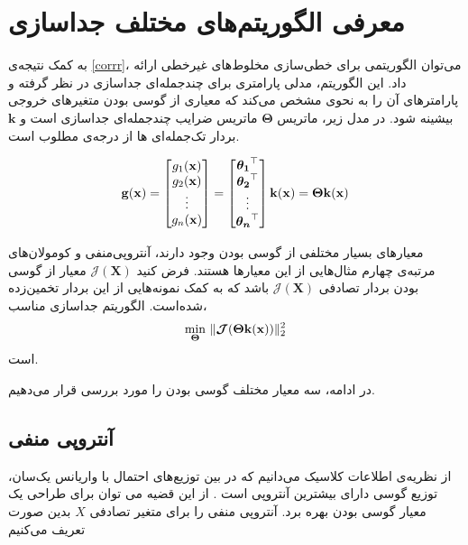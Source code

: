 \documentclass[oneside]{thesis}
\begin{document}
\section{معرفی الگوریتم‌های مختلف جداسازی}
به کمک نتیجه‌ی
\eqref{corrr}،
 می‌توان الگوریتمی برای خطی‌سازی مخلوط‌های غیرخطی ارائه داد. این الگوریتم، مدلی پارامتری برای چندجمله‌ای جداسازی در نظر گرفته و پارامترهای آن را به نحوی مشخص می‌کند که معیاری از گوسی بودن متغیر‌های خروجی بیشینه شود. در مدل زیر، ماتریس 
$\boldsymbol{\Theta}$
ماتریس ضرایب چند‌جمله‌ای جداسازی است و 
$\mathbf{k}$
بردار تک‌جمله‌ای ها از درجه‌ی مطلوب است.

\begin{equation*}
\label{E_Parametrizing}
{\mathbf{g}}({\mathbf{x}})=
\begin{bmatrix}
g_1({\mathbf{x}}) \\
g_2({\mathbf{x}}) \\
\vdots \\
g_n({\mathbf{x}})
\end{bmatrix}=
\begin{bmatrix}
\boldsymbol{\theta_1}^\top \\
\boldsymbol{\theta_2}^\top\\
\vdots \\
\boldsymbol{\theta_n}^\top
\end{bmatrix}{\mathbf{k}}({\mathbf{x}})=
\boldsymbol{\Theta}{\mathbf{k}}({\mathbf{x}})
\end{equation*}

معیارهای بسیار مختلفی از گوسی بودن وجود دارند، آنتروپی‌منفی و کومولان‌های مرتبه‌ی چهارم مثال‌هایی از این معیار‌ها هستند. فرض کنید 
$\mathcal{J}(\mathbf{X})$
معیار از گوسی بودن بردار تصادفی 
$\mathcal{J}(\mathbf{X})$
باشد که به کمک نمونه‌هایی از این بردار تخمین‌زده شده‌است. الگوریتم جداسازی مناسب، 
\begin{equation*}
\underset{\boldsymbol{\Theta}}{\min} \ \| \boldsymbol{\mathcal{J}}(\boldsymbol{\Theta}{\mathbf{k}}({\mathbf{x}})) \|_2^2
\end{equation*}
است. 

در ادامه، سه معیار مختلف گوسی بودن را مورد بررسی قرار می‌دهیم. 



\subsection{آنتروپی منفی}
از نظریه‌ی اطلاعات کلاسیک می‌دانیم که در بین توزیع‌های احتمال با واریانس یک‌سان، توزیع گوسی دارای بیشترین آنتروپی است
\cite{cover}. 
از این قضیه‌ می توان برای طراحی یک معیار گوسی بودن بهره برد. آنتروپی منفی را برای متغیر تصادفی  $X$ بدین صورت تعریف می‌کنیم
\end{document}

